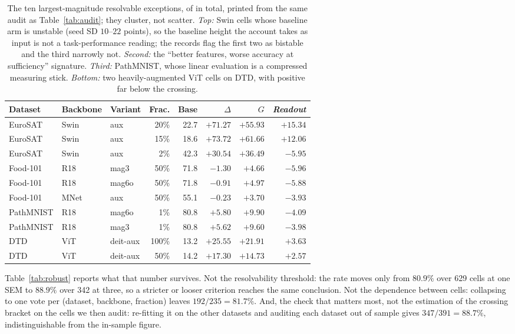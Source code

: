 \begin{table}[pos=htbp]
\caption{The ten largest-magnitude resolvable exceptions, of
\auditWrong{} in total, printed from the same audit as
Table~\ref{tab:audit}; they cluster, not scatter. \emph{Top:} Swin cells
whose baseline arm is unstable (seed SD $10$--$22$ points), so the baseline
height the account takes as input is not a task-performance reading; the
records flag the first two as bistable and the third narrowly not.
\emph{Second:} the ``better features, worse accuracy at sufficiency''
signature. \emph{Third:} PathMNIST, whose linear evaluation is a compressed
measuring stick. \emph{Bottom:} two heavily-augmented ViT cells on DTD, with
\readout{} positive far below the crossing.}
\label{tab:exceptions}
\centering\scriptsize
\setlength{\tabcolsep}{2.3pt}
\begin{tabular}{lllrrrrr}
\toprule
Dataset & Backbone & Variant & Frac. & Base & $\Delta$ & $G$ & \textit{Readout} \\
\midrule
EuroSAT & Swin & aux & 20\% & 22.7 & $+71.27$ & $+55.93$ & $+15.34$ \\
EuroSAT & Swin & aux & 15\% & 18.6 & $+73.72$ & $+61.66$ & $+12.06$ \\
EuroSAT & Swin & aux & 2\%  & 42.3 & $+30.54$ & $+36.49$ & $-5.95$ \\
\midrule
Food-101 & R18 & mag3 & 50\% & 71.8 & $-1.30$ & $+4.66$ & $-5.96$ \\
Food-101 & R18 & mag6o & 50\% & 71.8 & $-0.91$ & $+4.97$ & $-5.88$ \\
Food-101 & MNet & aux & 50\% & 55.1 & $-0.23$ & $+3.70$ & $-3.93$ \\
\midrule
PathMNIST & R18 & mag6o & 1\% & 80.8 & $+5.80$ & $+9.90$ & $-4.09$ \\
PathMNIST & R18 & mag3 & 1\% & 80.8 & $+5.62$ & $+9.60$ & $-3.98$ \\
\midrule
DTD & ViT & deit-aux & 100\% & 13.2 & $+25.55$ & $+21.91$ & $+3.63$ \\
DTD & ViT & deit-aux & 50\% & 14.2 & $+17.30$ & $+14.73$ & $+2.57$ \\
\bottomrule
\end{tabular}
\end{table}

Table~\ref{tab:robust} reports what that number survives. Not the resolvability
threshold: the rate moves only from $80.9\%$ over 629 cells at one SEM to
$88.9\%$ over 342 at three, so a stricter or looser criterion reaches the same
conclusion. Not the dependence between cells: collapsing to one vote per
(dataset, backbone, fraction) leaves $192/235 = 81.7\%$. And, the check that
matters most, not the estimation of the crossing bracket on the cells we then
audit: re-fitting it on the other datasets and auditing each dataset out of
sample gives $347/391 = 88.7\%$, indistinguishable from the in-sample figure.

